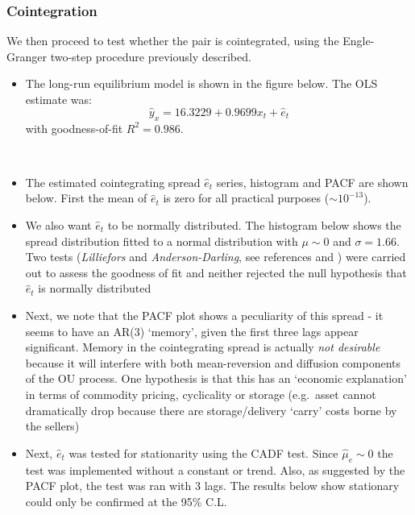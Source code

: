 \documentclass[11pt]{article}
\begin{document}
    \subsubsection{Cointegration}\label{cointegration2}
We then proceed to test whether the pair is cointegrated, using the
Engle-Granger two-step procedure previously described.
\begin{itemize}
\item
  The long-run equilibrium model is shown in the figure below. The OLS
  estimate was:
  \begin{equation}
   \hat{y}_x = 16.3229 + 0.9699 x_t + \hat{e}_t
  \end{equation}
  with goodness-of-fit \(R^2=0.986\).
\end{itemize}
    \begin{center}
    \end{center}
    { \hspace*{\fill} \\}
    \begin{itemize}
\item
  The estimated cointegrating spread \(\hat{e}_t\) series, histogram and
  PACF are shown below. First the mean of \(\hat{e}_t\) is zero for all
  practical purposes (\(\sim10^{-13}\)).
\item
  We also want \(\hat{e}_t\) to be normally distributed. The histogram
  below shows the spread distribution fitted to a normal distribution
  with \(\mu \sim 0\) and \(\sigma=1.66\). Two tests (\emph{Lilliefors}
  and \emph{Anderson-Darling}, see
  references \cite{ref1} and \cite{ref2})
  were carried out to assess the goodness of fit and neither rejected the
  null hypothesis that \(\hat{e}_t\) is normally distributed
\item
  Next, we note that the PACF plot shows a peculiarity of this spread -
  it seems to have an AR(3) `memory', given the first three lags appear
  significant. Memory in the cointegrating spread is actually \emph{not
  desirable} because it will interfere with both mean-reversion and
  diffusion components of the OU process. One hypothesis is that this
  has an `economic explanation' in terms of commodity pricing,
  cyclicality or storage (e.g.~asset cannot dramatically drop because
  there are storage/delivery `carry' costs borne by the sellers)
\item
  Next, \(\hat{e}_t\) was tested for stationarity using the CADF test.
  Since \(\hat{\mu}_e \sim 0\) the test was implemented without a
  constant or trend. Also, as suggested by the PACF plot, the test was
  ran with 3 lags. The results below show stationary could only be
  confirmed at the 95\% C.L.
\end{itemize}
\end{document}
